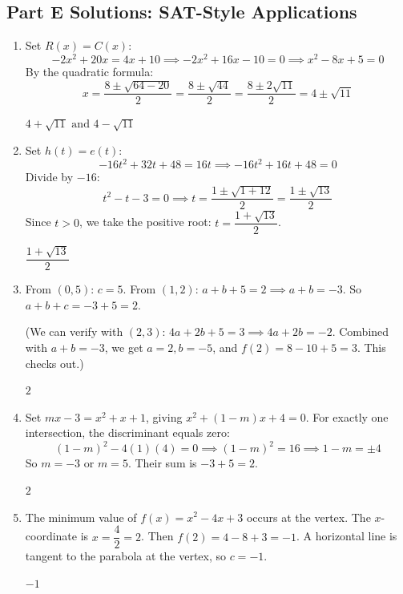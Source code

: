 \documentclass[14pt]{extarticle}
\begin{document}
\subsection*{Part E Solutions: SAT-Style Applications}
\begin{enumerate}
  \item Set \(R(x) = C(x)\):
  \[
  -2x^2 + 20x = 4x + 10 \implies -2x^2 + 16x - 10 = 0 \implies x^2 - 8x + 5 = 0
  \]
  By the quadratic formula:
  \[
  x = \frac{8 \pm \sqrt{64 - 20}}{2} = \frac{8 \pm \sqrt{44}}{2} = \frac{8 \pm 2\sqrt{11}}{2} = 4 \pm \sqrt{11}
  \]

  \(\boxed{4 + \sqrt{11} \text{ and } 4 - \sqrt{11}}\)

  \item Set \(h(t) = e(t)\):
  \[
  -16t^2 + 32t + 48 = 16t \implies -16t^2 + 16t + 48 = 0
  \]
  Divide by \(-16\):
  \[
  t^2 - t - 3 = 0 \implies t = \frac{1 \pm \sqrt{1 + 12}}{2} = \frac{1 \pm \sqrt{13}}{2}
  \]
  Since \(t > 0\), we take the positive root: \(t = \dfrac{1 + \sqrt{13}}{2}\).

  \(\boxed{\dfrac{1 + \sqrt{13}}{2}}\)

  \item From \((0, 5)\): \(c = 5\). From \((1, 2)\): \(a + b + 5 = 2 \implies a + b = -3\). So \(a + b + c = -3 + 5 = 2\).

  (We can verify with \((2, 3)\): \(4a + 2b + 5 = 3 \implies 4a + 2b = -2\). Combined with \(a + b = -3\), we get \(a = 2, b = -5\), and \(f(2) = 8 - 10 + 5 = 3\). This checks out.)

  \(\boxed{2}\)

  \item Set \(mx - 3 = x^2 + x + 1\), giving \(x^2 + (1 - m)x + 4 = 0\). For exactly one intersection, the discriminant equals zero:
  \[
  (1 - m)^2 - 4(1)(4) = 0 \implies (1 - m)^2 = 16 \implies 1 - m = \pm 4
  \]
  So \(m = -3\) or \(m = 5\). Their sum is \(-3 + 5 = 2\).

  \(\boxed{2}\)

  \item The minimum value of \(f(x) = x^2 - 4x + 3\) occurs at the vertex. The \(x\)-coordinate is \(x = \dfrac{4}{2} = 2\). Then \(f(2) = 4 - 8 + 3 = -1\). A horizontal line is tangent to the parabola at the vertex, so \(c = -1\).

  \(\boxed{-1}\)
\end{enumerate}

\end{document}
